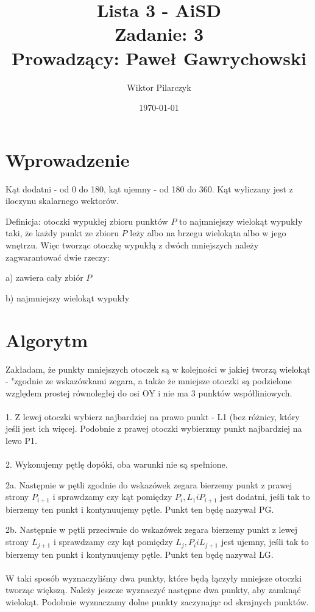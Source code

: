 \documentclass{article}
\author{Wiktor Pilarczyk}
\title{Lista 3 - AiSD\\\large{Zadanie: 3}\\\large{Prowadzący: Paweł Gawrychowski}}
\date{\today}
\begin{document}
\maketitle
\section{Wprowadzenie}
Kąt dodatni - od 0 do 180, kąt ujemny - od 180 do 360.
Kąt wyliczany jest z iloczynu skalarnego wektorów.

Definicja: otoczki wypukłej zbioru punktów $ P $ to najmniejszy wielokąt wypukły taki, że każdy punkt ze zbioru $ P $ leży albo na brzegu wielokąta albo w jego wnętrzu. Więc tworząc otoczkę wypukłą z dwóch mniejszych należy zagwarantować dwie rzeczy:

a) zawiera cały zbiór $ P $

b) najmniejszy wielokąt wypukły

\section{Algorytm}
Zakładam, że punkty mniejszych otoczek są w kolejności w jakiej tworzą wielokąt - "zgodnie ze wskazówkami zegara, a także że mniejsze otoczki są podzielone względem prostej równoległej do osi OY i nie ma 3 punktów współliniowych.
\\ \\
1. Z lewej otoczki wybierz najbardziej na prawo punkt - L1 (bez różnicy, który jeśli jest ich więcej. Podobnie z prawej otoczki wybierzmy punkt najbardziej na lewo P1.
\\ \\
2. Wykonujemy pętlę dopóki, oba warunki nie są spełnione.

2a. Następnie w pętli zgodnie do wskazówek zegara bierzemy punkt z prawej strony $P_{i+1}$ i sprawdzamy czy kąt pomiędzy $P_{i}, L_{1} i P_{i+1}$ jest dodatni, jeśli tak to bierzemy ten punkt i kontynuujemy pętle. Punkt ten będę nazywał PG.

2b. Następnie w pętli przeciwnie do wskazówek zegara bierzemy punkt z lewej strony $L_{j+1}$ i sprawdzamy czy kąt pomiędzy $L_{j}, P_{i} i L_{j+1}$ jest ujemny, jeśli tak to bierzemy ten punkt i kontynuujemy pętle. Punkt ten będę nazywał LG.
\\ \\
W taki sposób wyznaczyliśmy dwa punkty, które będą łączyły mniejsze otoczki tworząc większą. Należy jeszcze wyznaczyć następne dwa punkty, aby zamknąć wielokąt.
\newpage
Podobnie wyznaczamy dolne punkty zaczynając od skrajnych punktów.
\end{document}
